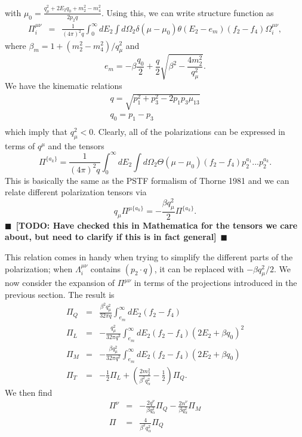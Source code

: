 \documentclass[12pt,letter]{article}
\newcommand{\todo}[1]{{$\blacksquare$~\textbf{\color{blue}[TODO: #1]}}~$\blacksquare$}
\begin{document}
with $\mu_0 = \frac{q_\mu^2 + 2 E_2 q_0 + m_2^2 - m_4^2}{2 p_2 q}$.  Using this, we can write structure function as 
\begin{eqnarray*}
\Pi^{\mu \nu}_{i} &=& \frac{1}{(4 \pi)^2 q} \int_{0}^\infty dE_2 
\int d \Omega_2 \delta(\mu - \mu_0) \theta(E_2-e_{m})
(f_2 - f_4) \Omega_i^{\mu \nu},
\end{eqnarray*} 
where $\beta_m = 1 + (m_2^2 - m_4^2)/q_\mu^2$ and
\begin{equation}
e_{m}=-\beta \frac{q_0}{2} + \frac{q}{2} \sqrt{\beta^2 - \frac{4 m_2^2}{q_\mu^2}}.
\end{equation}  
We have the kinematic relations
\begin{eqnarray*}
q = \sqrt{p_1^2 + p_3^2 - 2 p_1 p_3 \mu_{13}} \\
q_0 = p_1 - p_3 \\ 
\end{eqnarray*}
which imply that $q_\mu^2 < 0$. Clearly, all of the polarizations can be expressed
in terms of $q^\mu$ and the tensors
\begin{equation}
\Pi^{\{a_k\}} = \frac{1}{(4\pi)^2 q} \int_0^\infty dE_2 \int d\Omega_2 
\Theta(\mu-\mu_0) (f_2 - f_4) p_2^{a_1}...p_2^{a_k}.
\end{equation}
This is basically the same as the PSTF formalism of Thorne 1981 and we can relate
different polarization tensors via 
\begin{equation}
q_\mu \Pi^{\mu \{a_k\}} = - \frac{\beta q_\mu^2}{2}\Pi^{ \{a_k\}}.
\end{equation}
\todo{Have checked this in Mathematica for the tensors we care about, but need 
to clarify if this is in fact general}

This relation comes in handy when trying to simplify the different parts of the 
polarization; when $\Lambda^{\mu \nu}_i$ contains $(p_2 \cdot q)$, it can be
replaced with $-\beta q_\mu^2/2$.  We now consider the expansion of $\Pi^{\mu \nu}$ 
in terms of the projections introduced in the previous section. The result is 
\begin{eqnarray}
\Pi_Q &=& \frac{\beta^2 q_\mu^2}{32 \pi q} \int_{e_m}^\infty dE_2(f_2 - f_4) \\
\Pi_L &=&-\frac{q_\mu^2}{32 \pi q^3} \int_{e_m}^\infty dE_2 (f_2 - f_4) 
(2 E_2 + \beta q_0)^2 \\
\Pi_M &=&-\frac{\beta q_\mu^2}{32 \pi q^2} \int_{e_m}^\infty dE_2 (f_2 - f_4) 
(2 E_2 + \beta q_0) \\
\Pi_T &=& - \frac{1}{2}\Pi_L 
+ \left(\frac{2 m_2^2}{\beta^2 q_\alpha^2} - \frac{1}{2}\right)\Pi_Q.
\end{eqnarray}
We then find 
\begin{eqnarray}
\Pi^\nu &=& -\frac{2 q^\nu}{\beta q_\alpha^2} \Pi_Q 
- \frac{2 n^\nu}{\beta q_\alpha^2} \Pi_M \\
\Pi &=& \frac{4 }{\beta^2 q_\alpha^2} \Pi_Q 
\end{eqnarray}
\end{document}
